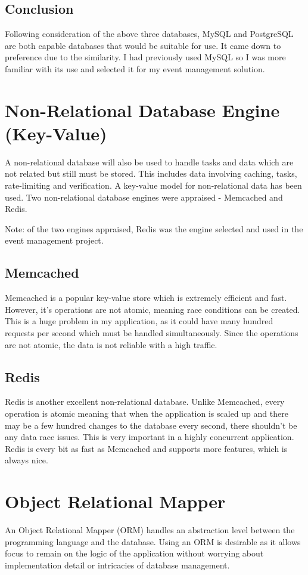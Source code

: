 \documentclass[a4paper,oneside,12pt]{report}
\begin{document}
	\subsection{Conclusion}
	Following consideration of the above three databases, MySQL and PostgreSQL are both capable databases that would be suitable for use. It came down to preference due to the similarity. I had previously used MySQL so I was more familiar with its use and selected it for my event management solution.

	\section{Non-Relational Database Engine (Key-Value)}
	A non-relational database will also be used to handle tasks and data which are not related but still must be stored. This includes data involving caching, tasks, rate-limiting and verification. A key-value model for non-relational data has been used. Two non-relational database engines were appraised - Memcached and Redis.
	
	\begin{framed}
	Note: of the two engines appraised, Redis was the engine selected and used in the event management project.
	\end{framed}

	\subsection{Memcached}
	Memcached is a popular key-value store which is extremely efficient and fast. However, it’s operations are not atomic, meaning race conditions can be created. This is a huge problem in my application, as it could have many hundred requests per second which must be handled simultaneously. Since the operations are not atomic, the data is not reliable with a high traffic.

	\subsection{Redis}
	Redis is another excellent non-relational database. Unlike Memcached, every operation is atomic meaning that when the application is scaled up and there may be a few hundred changes to the database every second, there shouldn't be any data race issues. This is very important in a highly concurrent application. Redis is every bit as fast as Memcached and supports more features, which is always nice.

	\section{Object Relational Mapper}
	An Object Relational Mapper (ORM) handles an abstraction level between the programming language and the database. Using an ORM is desirable as it allows focus to remain on the logic of the application without worrying about implementation detail or intricacies of database management.
	
\end{document}
